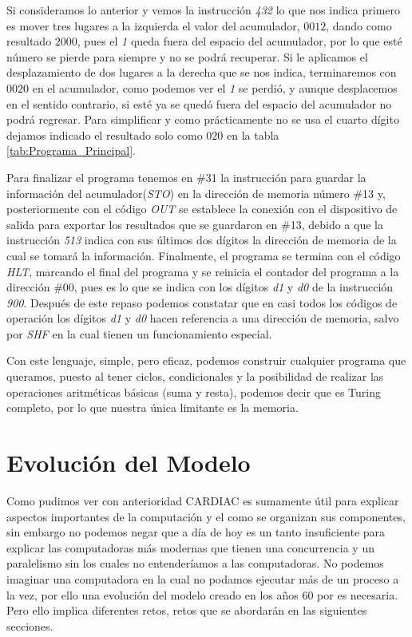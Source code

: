 \documentclass[letterpaper,12pt,oneside]{book}
\begin{document}
	Si consideramos lo anterior y vemos la instrucción \textit{432} lo que nos indica primero es mover tres lugares a la izquierda
	el valor del acumulador, $0012$, dando como resultado $2000$, pues el \textit{1} queda fuera
	del espacio del acumulador, por lo que esté número se pierde para siempre y no se podrá recuperar. Si le aplicamos el desplazamiento de dos lugares 	
	a la derecha que se nos indica, terminaremos con $0020$ en el acumulador, como podemos ver el \textit{1} se perdió, y aunque desplacemos
	en el sentido contrario, si esté ya se quedó fuera del espacio del acumulador no podrá regresar. Para simplificar y como prácticamente no se usa el cuarto dígito dejamos indicado el resultado solo como $020$ en la tabla \ref{tab:Programa_Principal}.
	
	
	Para finalizar el programa tenemos en \#31 la instrucción para guardar la información del acumulador(\textit{STO}) en la dirección de memoria número
	\#13  y, posteriormente con el código  \textit{OUT} se establece la conexión con el dispositivo de salida para exportar los resultados
	que se guardaron en \#13, debido a que la instrucción \textit{513} indica con sus últimos dos dígitos la dirección
	de memoria de la cual se tomará la información. Finalmente, el programa se termina con el código  \textit{HLT}, marcando el
	final del programa y se reinicia el contador del programa
	a la dirección \#00, pues es lo que se indica con los dígitos \textit{d1} y \textit{d0} de la instrucción \textit{900}. Después de este repaso podemos constatar que en casi todos los códigos de operación los dígitos \textit{d1} y \textit{d0} hacen
	referencia a una dirección de memoria, salvo por \textit{SHF} en la cual tienen un funcionamiento especial.
	
	Con este lenguaje, simple, pero eficaz, podemos construir cualquier programa que queramos,
	puesto al tener ciclos, condicionales y la posibilidad de realizar
	las operaciones aritméticas básicas (suma y resta), podemos
	decir que es Turing completo, por lo que nuestra única limitante es la memoria.
	
	
	

	\clearpage	
	
\chapter{Evolución del Modelo}  %

	Como pudimos ver con anterioridad CARDIAC es sumamente útil para explicar aspectos importantes de la computación y el como se organizan sus 	
	componentes, sin embargo no podemos negar que a día de hoy es un tanto insuficiente para explicar las computadoras más modernas que tienen
	una concurrencia y un paralelismo sin los cuales no entenderíamos a las computadoras. No podemos imaginar una computadora en la cual no podamos 	
	ejecutar más de un proceso a la vez, por ello una evolución del modelo creado en los años 60 por \cite{hegelbarger_instruction_1968} es
	necesaria. Pero ello implica diferentes retos, retos que se abordarán en las siguientes secciones.
	
\end{document}
